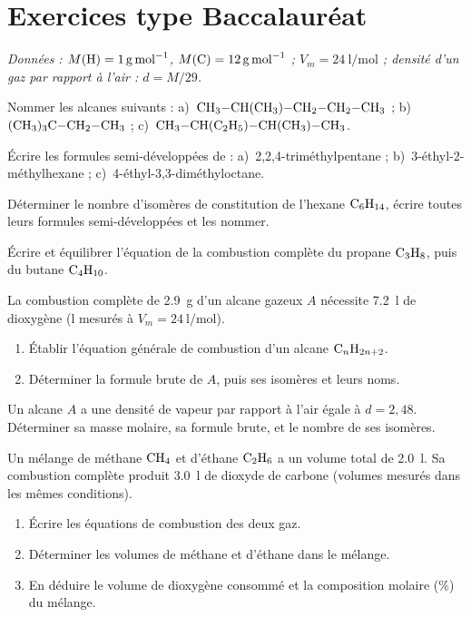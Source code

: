 \section{Exercices type Baccalauréat}
\textit{Données : $M(\ce{H})=\SI{1}{\gram\per\mol}$, $M(\ce{C})=\SI{12}{\gram\per\mol}$ ;
$V_m=\SI{24}{\litre\per\mol}$ ; densité d'un gaz par rapport à l'air : $d=M/29$.}


\exo{} Nommer les alcanes suivants :
a)~$\ce{CH3-CH(CH3)-CH2-CH2-CH3}$ ;
b)~$\ce{(CH3)3C-CH2-CH3}$ ;
c)~$\ce{CH3-CH(C2H5)-CH(CH3)-CH3}$.

\exo{} Écrire les formules semi-développées de : a)~2,2,4-triméthylpentane ;
b)~3-éthyl-2-méthylhexane ; c)~4-éthyl-3,3-diméthyloctane.

\exo{} Déterminer le nombre d'isomères de constitution de l'hexane $\ce{C6H14}$,
écrire toutes leurs formules semi-développées et les nommer.


\exo{} Écrire et équilibrer l'équation de la combustion complète du propane
$\ce{C3H8}$, puis du butane $\ce{C4H10}$.

\exo{} La combustion complète de \SI{2.9}{\gram} d'un alcane gazeux $A$
nécessite \SI{7.2}{\litre} de dioxygène (\si{\litre} mesurés à $V_m=\SI{24}{\litre\per\mol}$).
\begin{enumerate}[label=\arabic*)]
\item Établir l'équation générale de combustion d'un alcane $\ce{C_nH_{2n+2}}$.
\item Déterminer la formule brute de $A$, puis ses isomères et leurs noms.
\end{enumerate}

\exo{} Un alcane $A$ a une densité de vapeur par rapport à l'air égale à
$d = 2{,}48$. Déterminer sa masse molaire, sa formule brute, et le nombre de ses
isomères.

\exo{} Un mélange de méthane $\ce{CH4}$ et d'éthane $\ce{C2H6}$ a un volume
total de \SI{2.0}{\litre}. Sa combustion complète produit \SI{3.0}{\litre} de
dioxyde de carbone (volumes mesurés dans les mêmes conditions).
\begin{enumerate}[label=\arabic*)]
\item Écrire les équations de combustion des deux gaz.
\item Déterminer les volumes de méthane et d'éthane dans le mélange.
\item En déduire le volume de dioxygène consommé et la composition molaire (\%) du mélange.
\end{enumerate}

